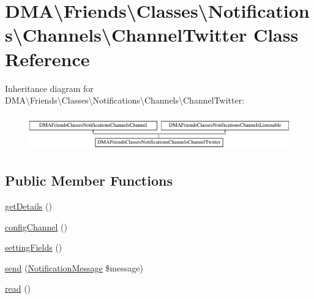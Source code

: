 \hypertarget{classDMA_1_1Friends_1_1Classes_1_1Notifications_1_1Channels_1_1ChannelTwitter}{}\section{D\+M\+A\textbackslash{}Friends\textbackslash{}Classes\textbackslash{}Notifications\textbackslash{}Channels\textbackslash{}Channel\+Twitter Class Reference}
\label{classDMA_1_1Friends_1_1Classes_1_1Notifications_1_1Channels_1_1ChannelTwitter}
Inheritance diagram for D\+M\+A\textbackslash{}Friends\textbackslash{}Classes\textbackslash{}Notifications\textbackslash{}Channels\textbackslash{}Channel\+Twitter\+:\begin{figure}[H]
\begin{center}
\leavevmode
\includegraphics[height=1.546961cm]{dd/d13/classDMA_1_1Friends_1_1Classes_1_1Notifications_1_1Channels_1_1ChannelTwitter}
\end{center}
\end{figure}
\subsection*{Public Member Functions}
\begin{DoxyCompactItemize}
\item 
\hyperlink{classDMA_1_1Friends_1_1Classes_1_1Notifications_1_1Channels_1_1ChannelTwitter_a25df1af4306d6282d23082c17054aeeb}{get\+Details} ()
\item 
\hyperlink{classDMA_1_1Friends_1_1Classes_1_1Notifications_1_1Channels_1_1ChannelTwitter_a6e5f6e1abe8d6b7c9d0442c3f2560b44}{config\+Channel} ()
\item 
\hyperlink{classDMA_1_1Friends_1_1Classes_1_1Notifications_1_1Channels_1_1ChannelTwitter_a51e362d79b1978fa683709e2794cb6d5}{setting\+Fields} ()
\item 
\hyperlink{classDMA_1_1Friends_1_1Classes_1_1Notifications_1_1Channels_1_1ChannelTwitter_a14439c4b83e7d0e0dd0437f141a998e5}{send} (\hyperlink{classDMA_1_1Friends_1_1Classes_1_1Notifications_1_1NotificationMessage}{Notification\+Message} \$message)
\item 
\hyperlink{classDMA_1_1Friends_1_1Classes_1_1Notifications_1_1Channels_1_1ChannelTwitter_a3b453a0cb63ace5be8f33763949af5b1}{read} ()
\end{DoxyCompactItemize}
